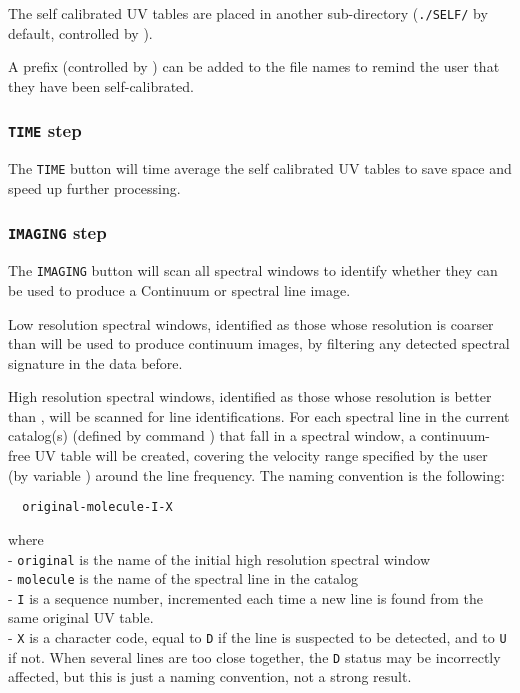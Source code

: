 The self calibrated UV tables are placed in another sub-directory
(\texttt{./SELF/} by default, controlled by ).

A prefix (controlled by ) can be added
to the file names to remind the user that they have been self-calibrated.

\subsubsection{\texttt{TIME} step}

The \texttt{TIME} button will time average the self calibrated
UV tables to save space and speed up further processing.

\subsubsection{\texttt{IMAGING} step}

The \texttt{IMAGING} button will scan all spectral windows to
identify whether they can be used to produce a Continuum or
spectral line image. 

  Low resolution spectral windows, identified as those whose
resolution is coarser than  will be used to
produce continuum images, by filtering any detected spectral
signature in the data before.

  High resolution spectral windows, identified as those whose
resolution is better than , will be scanned
for line identifications. For each spectral line in the current 
catalog(s) (defined by command ) 
that fall in a spectral window, a continuum-free UV table will be
created, covering the velocity range specified by the user (by
variable ) around the line frequency. The naming
convention is the following:
\begin{verbatim}
  original-molecule-I-X
\end{verbatim}
where \\
- \texttt{original} is the name of the initial high resolution
spectral window\\
- \texttt{molecule} is the name of the spectral line in the catalog\\
- \texttt{I} is a sequence number, incremented each time a new
line is found from the same original UV table.\\
- \texttt{X} is a character code, equal to \texttt{D} if the line
is suspected to be detected, and to \texttt{U} if not. When several
lines are too close together, the \texttt{D} status may be incorrectly
affected, but this is just a naming convention, not a strong result.

